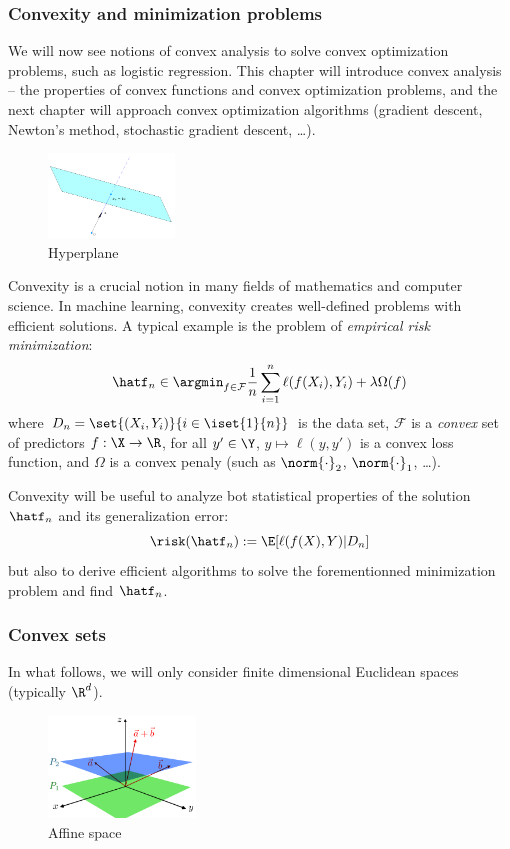 \documentclass{../cs-classes/cs-classes}
\begin{document}
\subsubsection{Convexity and minimization problems}
We will now see notions of convex analysis to solve convex optimization problems, such as logistic regression. This chapter will introduce convex analysis -- the properties of convex functions and convex optimization problems, and the next chapter will approach convex optimization algorithms (gradient descent, Newton's method, stochastic gradient descent, \dots).
\begin{figure}
    \centering
    \captionsetup{justification=centering}
    \includegraphics[width=0.3\textwidth]{images/hyperplane.png}
    \caption{Hyperplane}
\end{figure}

Convexity is a crucial notion in many fields of mathematics and computer science. In machine learning, convexity creates well-defined problems with efficient solutions. A typical example is the problem of \emph{empirical risk minimization}:
\begin{equation*}
    \hatf_n\in\argmin_{f\in\mathcal{F}}\frac{1}{n}\sum_{i=1}^n\ell(f(X_i), Y_i)+\lambda\Omega(f)
\end{equation*}
where $D_n=\set{(X_i, Y_i)}{i\in\iset{1}{n}}$ is the data set, $\mathcal{F}$ is a \emph{convex} set of predictors $f:\X\to\R$, for all $y'\in\Y$, $y\mapsto\ell(y, y')$ is a convex loss function, and $\Omega$ is a convex penaly (such as $\norm{\cdot}_2$, $\norm{\cdot}_1$, \dots).

Convexity will be useful to analyze bot statistical properties of the solution $\hatf_n$ and its generalization error:
\begin{equation*}
    \risk(\hatf_n):=\E[\ell(f(X), Y)|D_n]
\end{equation*}
but also to derive efficient algorithms to solve the forementionned minimization problem and find $\hatf_n$.

\subsubsection{Convex sets}
In what follows, we will only consider finite dimensional Euclidean spaces (typically $\R^d$).
\begin{figure}
    \centering
        \captionsetup{justification=centering}
        \includegraphics[width=0.35\textwidth]{images/affine-space.png}
        \caption{Affine space}
\end{figure}
\end{document}
